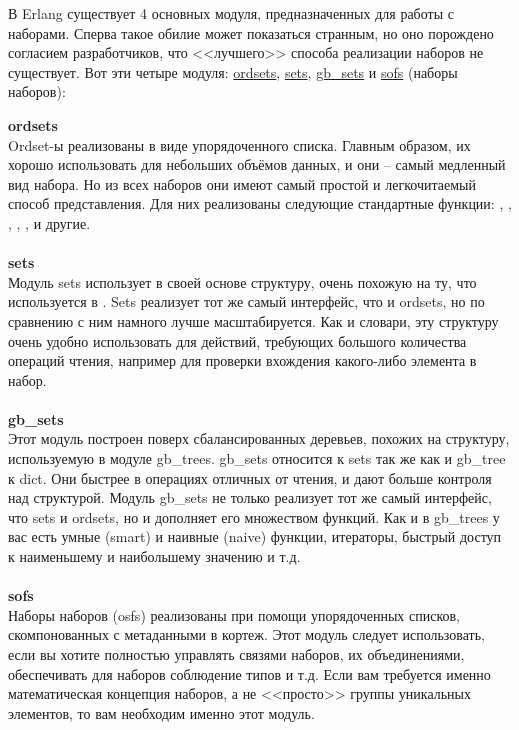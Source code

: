 В Erlang существует 4 основных модуля, предназначенных для работы с наборами.
Сперва такое обилие может показаться странным, но оно порождено согласием разработчиков, что <<лучшего>> способа реализации наборов не существует.
Вот эти четыре модуля: \href{http://erldocs.com/R15B/stdlib/ordets.html}{ordsets}, \href{http://erldocs.com/R15B/stdlib/sets.html}{sets}, \href{http://erldocs.com/R15B/stdlib/gb\_sets.html}{gb\_sets} и \href{http://erldocs.com/R15B/stdlib/sofs.html}{sofs} (наборы наборов):

\begin{minipage}{1.0\linewidth}
    \textbf{ordsets}\\
    Ordset\--ы реализованы в виде упорядоченного списка.
    Главным образом, их хорошо использовать для небольших объёмов данных, и они \--- самый медленный вид набора.
    Но из всех наборов они имеют самый простой и легкочитаемый способ представления.
    Для них реализованы следующие стандартные функции: , , , , ,  и другие.\\
    \\
    \textbf{sets}\\
    Модуль sets использует в своей основе структуру, очень похожую на ту, что используется в .
    Sets реализует тот же самый интерфейс, что и ordsets, но по сравнению с ним намного лучше масштабируется.
    Как и словари, эту структуру очень удобно использовать для действий, требующих большого количества операций чтения, например для проверки вхождения какого\--либо элемента в набор.\\
    \\
    \textbf{gb\_sets}\\
    Этот модуль построен поверх сбалансированных деревьев, похожих на структуру, используемую в модуле gb\_trees.
    gb\_sets относится к sets так же как и gb\_tree к dict.
    Они быстрее в операциях отличных от чтения, и дают больше контроля над структурой.
    Модуль gb\_sets не только реализует тот же самый интерфейс, что sets и ordsets, но и дополняет его множеством функций.
    Как и в gb\_trees у вас есть умные (smart) и наивные (naive) функции, итераторы, быстрый доступ к наименьшему и наибольшему значению и т.д.\\
    \\
    \textbf{sofs}\\
    Наборы наборов (osfs) реализованы при помощи упорядоченных списков, скомпонованных с метаданными в кортеж.
    Этот модуль следует использовать, если вы хотите полностью управлять связями наборов, их объединениями, обеспечивать для наборов соблюдение типов и т.д.
    Если вам требуется именно математическая концепция наборов, а не <<просто>> группы уникальных элементов, то вам необходим  именно этот модуль.
\end{minipage}
